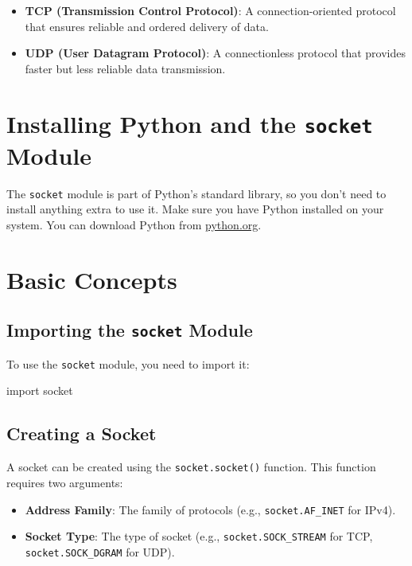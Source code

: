 \documentclass[
  letterpaper,
  DIV=11,
  numbers=noendperiod]{scrreprt}
\newenvironment{Shaded}{\begin{snugshade}}{\end{snugshade}}
\newcommand{\ImportTok}[1]{\textcolor[rgb]{0.00,0.46,0.62}{#1}}
\newcommand{\NormalTok}[1]{\textcolor[rgb]{0.00,0.23,0.31}{#1}}
\providecommand{\tightlist}{%
  \setlength{\itemsep}{0pt}\setlength{\parskip}{0pt}}\usepackage{longtable,booktabs,array}
\begin{document}
\begin{itemize}
\tightlist
\item
  \textbf{TCP (Transmission Control Protocol)}: A connection-oriented
  protocol that ensures reliable and ordered delivery of data.
\item
  \textbf{UDP (User Datagram Protocol)}: A connectionless protocol that
  provides faster but less reliable data transmission.
\end{itemize}

\section{\texorpdfstring{Installing Python and the \texttt{socket}
Module}{Installing Python and the socket Module}}\label{installing-python-and-the-socket-module}

The \texttt{socket} module is part of Python's standard library, so you
don't need to install anything extra to use it. Make sure you have
Python installed on your system. You can download Python from
\href{https://www.python.org/}{python.org}.

\section{Basic Concepts}\label{basic-concepts-1}

\subsection{\texorpdfstring{Importing the \texttt{socket}
Module}{Importing the socket Module}}\label{importing-the-socket-module}

To use the \texttt{socket} module, you need to import it:

\begin{Shaded}
\begin{Highlighting}[]
\ImportTok{import}\NormalTok{ socket}
\end{Highlighting}
\end{Shaded}

\subsection{Creating a Socket}\label{creating-a-socket}

A socket can be created using the \texttt{socket.socket()} function.
This function requires two arguments:

\begin{itemize}
\tightlist
\item
  \textbf{Address Family}: The family of protocols (e.g.,
  \texttt{socket.AF\_INET} for IPv4).
\item
  \textbf{Socket Type}: The type of socket (e.g.,
  \texttt{socket.SOCK\_STREAM} for TCP, \texttt{socket.SOCK\_DGRAM} for
  UDP).
\end{itemize}
\end{document}
